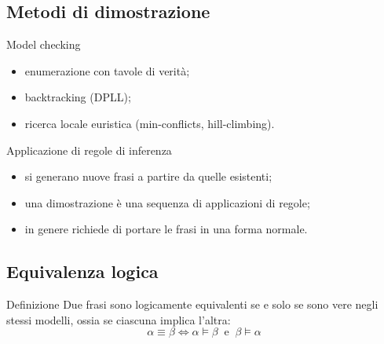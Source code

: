 \documentclass[11pt, a4paper]{article}
\begin{document}
\subsection{Metodi di dimostrazione}

\begin{tcbraster}[raster columns=2, raster equal height, raster column skip=10pt, raster before skip=8pt, raster after skip=10pt]
  \begin{defbox}{Model checking}
    \raggedright
    \begin{itemize}
      \item enumerazione con tavole di verità;
      \item backtracking (DPLL);
      \item ricerca locale euristica (min-conflicts, hill-climbing).
    \end{itemize}
  \end{defbox}
  \begin{defbox}{Applicazione di regole di inferenza}
    \raggedright
    \begin{itemize}
      \item si generano nuove frasi a partire da quelle esistenti;
      \item una dimostrazione è una sequenza di applicazioni di regole;
      \item in genere richiede di portare le frasi in una forma normale.
    \end{itemize}
  \end{defbox}
\end{tcbraster}

\subsection{Equivalenza logica}

\begin{defbox}{Definizione}
  Due frasi sono logicamente equivalenti se e solo se sono vere negli stessi modelli, ossia se ciascuna implica l'altra:
  \[
    \alpha \equiv \beta \iff \alpha \models \beta \ \text{ e } \ \beta \models \alpha
  \]
\end{defbox}
\end{document}
